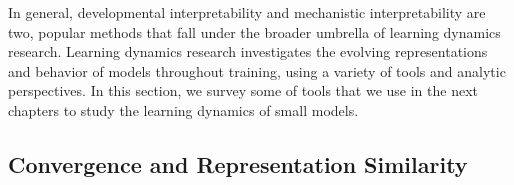 In general, developmental interpretability and mechanistic interpretability are two, popular methods that fall under the broader umbrella of learning dynamics research. Learning dynamics research investigates the evolving representations and behavior of models throughout training, using a variety of tools and analytic perspectives. In this section, we survey some of tools that we use in the next chapters to study the learning dynamics of small models.





\subsection{Convergence and Representation Similarity}

